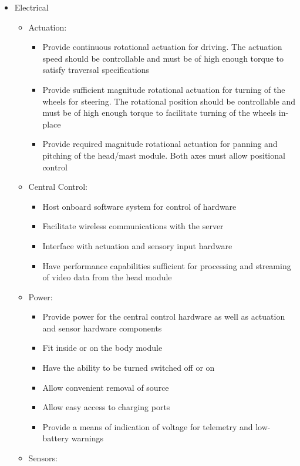 \begin{itemize}
        \item Electrical
        \begin{itemize}
          \item Actuation:
          \begin{itemize}
            \item Provide continuous rotational actuation for driving. The actuation speed should be controllable and must be of high enough torque to satisfy traversal specifications
            \item Provide sufficient magnitude rotational actuation for turning of the wheels for steering. The rotational position should be controllable and must be of high enough torque to facilitate turning of the wheels in-place
            \item Provide required magnitude rotational actuation for panning and pitching of the head/mast module. Both axes must allow positional control
          \end{itemize}
          \item Central Control:
          \begin{itemize}
            \item Host onboard software system for control of hardware
            \item Facilitate wireless communications with the server
            \item Interface with actuation and sensory input hardware
            \item Have performance capabilities sufficient for processing and streaming of video data from the head module
          \end{itemize}
          \item Power:
          \begin{itemize}
            \item Provide power for the central control hardware as well as actuation and sensor hardware components
            \item Fit inside or on the body module
            \item Have the ability to be turned switched off or on
            \item Allow convenient removal of source
            \item Allow easy access to charging ports
            \item Provide a means of indication of voltage for telemetry and low-battery warnings
          \end{itemize}
          \item Sensors:

\end{itemize}
\end{itemize}
